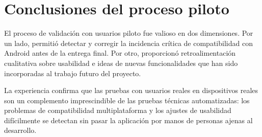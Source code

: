 \section{Conclusiones del proceso piloto}

El proceso de validación con usuarios piloto fue valioso en dos dimensiones. Por un lado, permitió detectar y corregir la incidencia crítica de compatibilidad con Android antes de la entrega final. Por otro, proporcionó retroalimentación cualitativa sobre usabilidad e ideas de nuevas funcionalidades que han sido incorporadas al trabajo futuro del proyecto.

La experiencia confirma que las pruebas con usuarios reales en dispositivos reales son un complemento imprescindible de las pruebas técnicas automatizadas: los problemas de compatibilidad multiplataforma y los ajustes de usabilidad difícilmente se detectan sin pasar la aplicación por manos de personas ajenas al desarrollo.
